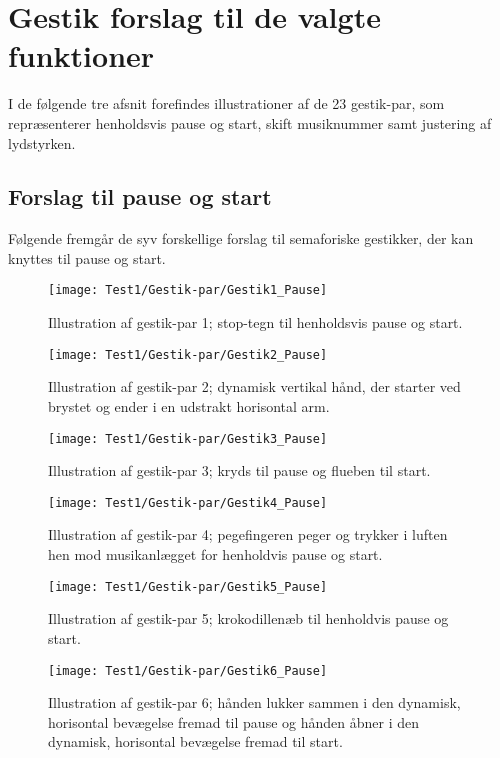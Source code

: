 \chapter{Gestik forslag til de valgte funktioner}
\label{app:GestikForslagFunktioner}
%
I de følgende tre afsnit forefindes illustrationer af de 23 gestik-par, som repræsenterer henholdsvis pause og start, skift musiknummer samt justering af lydstyrken.
%
\section{Forslag til pause og start}
\label{app:ForslagPauseOgStart}
%
Følgende fremgår de syv forskellige forslag til semaforiske gestikker, der kan knyttes til pause og start.
%
\begin{figure}[H]
	\centering
	\texttt{[image: Test1/Gestik-par/Gestik1\_Pause]}
	\caption{Illustration af gestik-par 1; stop-tegn til henholdsvis pause og start.}
	\label{fig:GestikPar1PauseApp}
\end{figure}
\noindent
%
%
\begin{figure}[H]
	\centering
	\texttt{[image: Test1/Gestik-par/Gestik2\_Pause]}
	\caption{Illustration af gestik-par 2; dynamisk vertikal hånd, der starter ved brystet og ender i en udstrakt horisontal arm.}
	\label{fig:GestikPar2PauseApp}
\end{figure}
\noindent
%
\newpage
%
\begin{figure}[H]
	\centering
	\texttt{[image: Test1/Gestik-par/Gestik3\_Pause]}
	\caption{Illustration af gestik-par 3; kryds til pause og flueben til start.}
	\label{fig:GestikPar3PauseApp}
\end{figure}
\noindent
%
%
\begin{figure}[H]
	\centering
	\texttt{[image: Test1/Gestik-par/Gestik4\_Pause]}
	\caption{Illustration af gestik-par 4; pegefingeren peger og trykker i luften hen mod musikanlægget for henholdvis pause og start.}
	\label{fig:GestikPar4PauseApp}
\end{figure}
\noindent
%
%
\begin{figure}[H]
	\centering
	\texttt{[image: Test1/Gestik-par/Gestik5\_Pause]}
	\caption{Illustration af gestik-par 5; krokodillenæb til henholdvis pause og start.}
	\label{fig:GestikPar5PauseApp}
\end{figure}
\noindent
%
%
\begin{figure}[H]
	\centering
	\texttt{[image: Test1/Gestik-par/Gestik6\_Pause]}
	\caption{Illustration af gestik-par 6; hånden lukker sammen i den dynamisk, horisontal bevægelse fremad til pause og hånden åbner i den dynamisk, horisontal bevægelse fremad til start.}
	\label{fig:GestikPar6PauseApp}
\end{figure}

